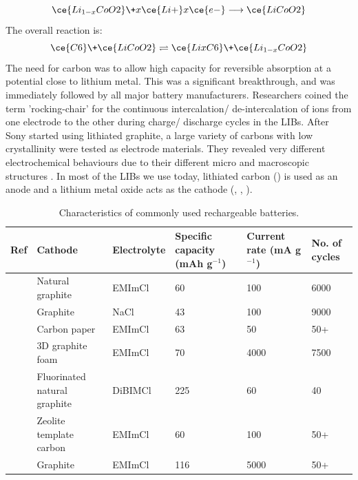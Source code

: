 \begin{equation}
\ce{Li_{1-x}CoO2} \+ x\ce{Li+} x\ce{e-} \longrightarrow \ce{LiCoO2}
\end{equation}
The overall reaction is:
\begin{equation}
\ce{C6} \+ \ce{LiCoO2} \rightleftharpoons \ce{LixC6} \+ \ce{Li_{1-x}CoO2}
\end{equation}
The need for carbon was to allow high capacity for reversible  absorption at a potential close to lithium metal. This was a significant breakthrough, and was immediately followed by all major battery manufacturers. Researchers coined the term 'rocking-chair' for the  continuous intercalation/ de-intercalation of ions from one electrode to the other during charge/ discharge cycles in the LIBs. After Sony started using lithiated graphite, a large variety of carbons with low crystallinity were tested as electrode materials. They revealed very different electrochemical behaviours due to their different micro and macroscopic structures \cite{yoo_large_2008}. In most of the LIBs we use today, lithiated carbon () is used as an anode and a lithium metal oxide acts as the cathode (, , ).  

\begin{table}
\caption{Characteristics of commonly used rechargeable batteries.} \label{tabCref}
\begin{center}
\begin{tabular}{ |p{0.5cm}|p{2.5cm}|p{2cm}|p{2.5cm}|p{2.5cm}|p{1.5cm}|}
\hline
\textbf{Ref} & \textbf{Cathode} & \textbf{Electrolyte} & \textbf{Specific capacity (mAh g$^{-1}$)} & \textbf{Current rate (mA g$^{-1}$)} & \textbf{No. of cycles} \\
\hline
\cite{wang_advanced_2017} & Natural graphite & EMImCl & 60 & 100 & 6000 \\
\cite{song_long-life_2017} & Graphite & NaCl & 43 & 100 & 9000 \\
\cite{sun_new_2015} & Carbon paper & EMImCl & 63 & 50 & 50+ \\
\cite{lin_ultrafast_2015} & 3D graphite foam & EMImCl & 70 & 4000 & 7500 \\
\cite{rani_fluorinated_2013} & Fluorinated natural graphite & DiBIMCl & 225 & 60 & 40 \\
\cite{stadie_zeolite-templated_2017} & Zeolite template carbon & EMImCl & 60 & 100 & 50+ \\
& Graphite & EMImCl & 116 & 5000 & 50+ \\*

\hline
\end{tabular}
\end{center}
\end{table}

